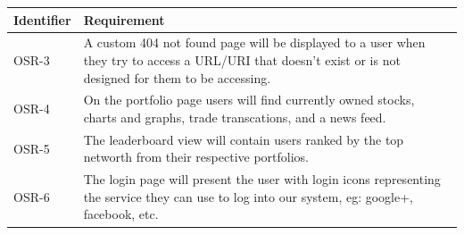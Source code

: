 \renewcommand\arraystretch{2}
\begin{longtable}{|p{0.6in}|p{4.6in}|}
\hline
{\large \color{color1}Identifier}&{\large \color{color1}Requirement} \\ \hline

OSR-3&  A custom 404 not found page will be displayed to a user when they try to  access
a URL/URI that doesn't exist or is not designed for them to be accessing. \\ \hline

OSR-4& On the portfolio page users will find currently owned stocks, charts and graphs,
trade transcations, and a news feed. \\ \hline

OSR-5&  The leaderboard view will contain users ranked by the top networth from their
respective portfolios. \\ \hline

OSR-6&  The login page will present the user with login icons representing the service
they can use to log into our system, eg: google+, facebook, etc. \\ \hline

\end{longtable}

